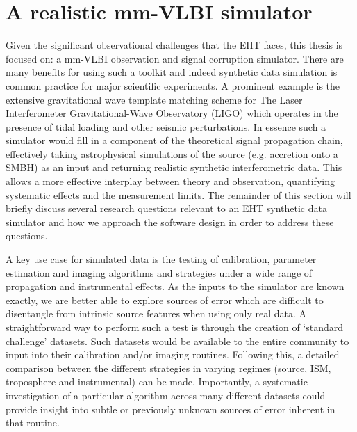 \section{A realistic mm-VLBI simulator}

Given the significant observational challenges that the EHT faces, this thesis is focused on: a mm-VLBI observation and signal corruption simulator. There are many benefits for using such a toolkit and indeed synthetic data simulation is common practice for major scientific experiments. A prominent example is the extensive gravitational wave template matching scheme for The Laser Interferometer Gravitational-Wave Observatory (LIGO) which operates in the presence of tidal loading and other seismic perturbations. In essence such a simulator would fill in a component of the theoretical signal propagation chain, effectively taking astrophysical simulations of the source (e.g. accretion onto a SMBH) as an input and returning realistic synthetic interferometric data. This allows a more effective interplay between theory and observation, quantifying systematic effects and the measurement limits. The remainder of this section will briefly discuss several research questions relevant to an EHT synthetic data simulator and how we approach the software design in order to address these questions. 


A key use case for simulated data is the testing of calibration, parameter estimation and imaging algorithms and strategies under a wide range of propagation and instrumental effects. As the inputs to the simulator are known exactly, we are better able to explore sources of error which are difficult to disentangle from intrinsic source features when using only real data. A straightforward way to perform such a test is through the creation of `standard challenge' datasets. Such datasets would be available to the entire community to input into their calibration and/or imaging routines. Following this, a detailed comparison between the different strategies in varying regimes (source, ISM, troposphere and instrumental) can be made. Importantly, a systematic investigation of a particular algorithm across many different datasets could provide insight into subtle or previously unknown sources of error inherent in that routine.


